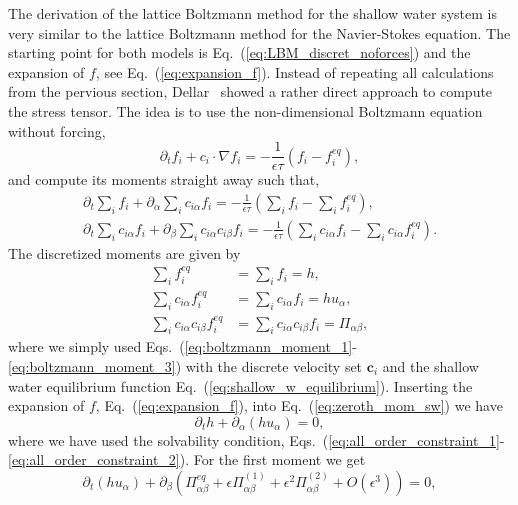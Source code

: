 The derivation of the lattice Boltzmann method for the shallow water system is very similar to the lattice Boltzmann method for the Navier-Stokes equation. 
The starting point for both models is Eq.~(\ref{eq:LBM_discret_noforces}) and the expansion of $f$, see Eq.~(\ref{eq:expansion_f}). 
Instead of repeating all calculations from the pervious section, Dellar~\cite{dellarNonhydrodynamicModesPriori2002} showed a rather direct approach to compute the stress tensor. 
The idea is to use the non-dimensional Boltzmann equation without forcing,
\begin{equation}\label{eq:dellar_sw_lbe}
  \partial_t f_i + c_i\cdot\nabla f_i = -\frac{1}{\epsilon\tau}(f_i - f_i^{eq}),  
\end{equation}
and compute its moments straight away such that,
\begin{align}
    \partial_t \sum_i f_i + \partial_{\alpha}\sum_i c_{i\alpha} f_i = -\frac{1}{\epsilon\tau}\left(\sum_i f_i - \sum_i f_i^{eq}\right),\label{eq:zeroth_mom_sw}\\
    \partial_t \sum_i c_{i\alpha} f_i + \partial_{\beta}\sum_i c_{i\alpha} c_{i\beta} f_i = -\frac{1}{\epsilon\tau}\left(\sum_i c_{i\alpha} f_i - \sum_ic_{i\alpha} f_i^{eq}\right).\label{eq:first_mom_sw} 
\end{align}
The discretized moments are given by
\begin{align}
    \sum_i f_i^{eq} &= \sum_i f_i = h,\label{eq:sw_lbm_mom_0}\\
    \sum_i c_{i\alpha}f_i^{eq} &= \sum_i c_{i\alpha}f_i = hu_{\alpha},\label{eq:sw_lbm_mom_1}\\
    \sum_i c_{i\alpha}c_{i\beta}f^{eq}_i &= \sum_i c_{i\alpha}c_{i\beta}f_i = \Pi_{\alpha\beta},\label{eq:sw_lbm_mom_2}
\end{align}
where we simply used Eqs.~(\ref{eq:boltzmann_moment_1}-\ref{eq:boltzmann_moment_3}) with the discrete velocity set $\mathbf{c}_i$ and the shallow water equilibrium function Eq.~(\ref{eq:shallow_w_equilibrium}).
Inserting the expansion of $f$, Eq.~(\ref{eq:expansion_f}), into Eq.~(\ref{eq:zeroth_mom_sw}) we have
\begin{equation}
    \partial_t h + \partial_{\alpha}(h u_{\alpha}) = 0,
\end{equation}
where we have used the solvability condition, Eqs.~(\ref{eq:all_order_constraint_1}-\ref{eq:all_order_constraint_2}). 
For the first moment we get
\begin{equation}
    \partial_t (hu_{\alpha}) + \partial_{\beta}\left(\Pi^{eq}_{\alpha\beta} + \epsilon\Pi^{(1)}_{\alpha\beta} + \epsilon^2\Pi^{(2)}_{\alpha\beta} + O(\epsilon^3)\right) = 0,
\end{equation}
